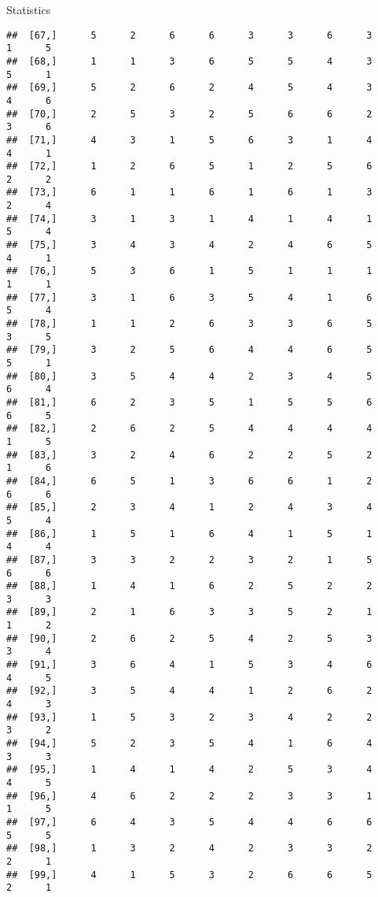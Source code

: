 \documentclass[
  ignorenonframetext,
]{beamer}
\begin{document}
\begin{frame}[fragile]{Statistics}
\begin{verbatim}
##  [67,]      5      2      6      6      3      3      6      3      1      5
##  [68,]      1      1      3      6      5      5      4      3      5      1
##  [69,]      5      2      6      2      4      5      4      3      4      6
##  [70,]      2      5      3      2      5      6      6      2      3      6
##  [71,]      4      3      1      5      6      3      1      4      4      1
##  [72,]      1      2      6      5      1      2      5      6      2      2
##  [73,]      6      1      1      6      1      6      1      3      2      4
##  [74,]      3      1      3      1      4      1      4      1      5      4
##  [75,]      3      4      3      4      2      4      6      5      4      1
##  [76,]      5      3      6      1      5      1      1      1      1      1
##  [77,]      3      1      6      3      5      4      1      6      5      4
##  [78,]      1      1      2      6      3      3      6      5      3      5
##  [79,]      3      2      5      6      4      4      6      5      5      1
##  [80,]      3      5      4      4      2      3      4      5      6      4
##  [81,]      6      2      3      5      1      5      5      6      6      5
##  [82,]      2      6      2      5      4      4      4      4      1      5
##  [83,]      3      2      4      6      2      2      5      2      1      6
##  [84,]      6      5      1      3      6      6      1      2      6      6
##  [85,]      2      3      4      1      2      4      3      4      5      4
##  [86,]      1      5      1      6      4      1      5      1      4      4
##  [87,]      3      3      2      2      3      2      1      5      6      6
##  [88,]      1      4      1      6      2      5      2      2      3      3
##  [89,]      2      1      6      3      3      5      2      1      1      2
##  [90,]      2      6      2      5      4      2      5      3      3      4
##  [91,]      3      6      4      1      5      3      4      6      4      5
##  [92,]      3      5      4      4      1      2      6      2      4      3
##  [93,]      1      5      3      2      3      4      2      2      3      2
##  [94,]      5      2      3      5      4      1      6      4      3      3
##  [95,]      1      4      1      4      2      5      3      4      4      5
##  [96,]      4      6      2      2      2      3      3      1      1      5
##  [97,]      6      4      3      5      4      4      6      6      5      5
##  [98,]      1      3      2      4      2      3      3      2      2      1
##  [99,]      4      1      5      3      2      6      6      5      2      1

\end{verbatim}
\end{frame}
\end{document}
